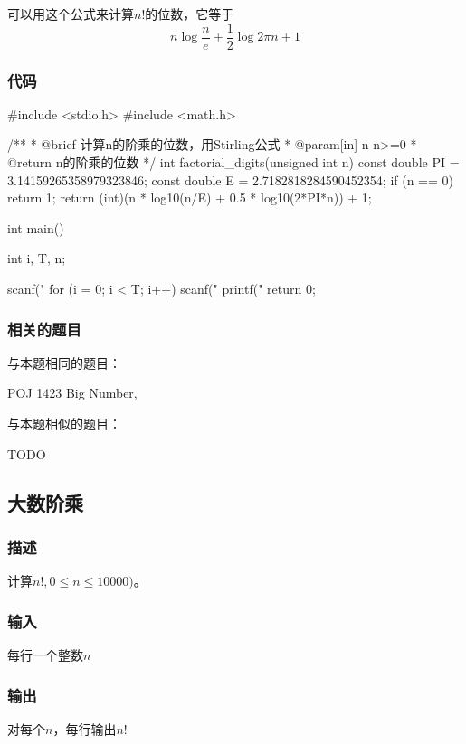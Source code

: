 可以用这个公式来计算$n!$的位数，它等于
$$
n\log{\dfrac{n}{e}}+\dfrac{1}{2}\log{2\pi n}+1
$$

\subsubsection{代码}
\begin{Codex}[label=bigint_factorial_digits.c]
#include <stdio.h>
#include <math.h>

/**
 * @brief 计算n的阶乘的位数，用Stirling公式
 * @param[in] n n>=0
 * @return n的阶乘的位数
 */
int factorial_digits(unsigned int n) {
    const double PI = 3.14159265358979323846;
    const double E = 2.7182818284590452354;
    if (n == 0) return 1;
    return (int)(n * log10(n/E) + 0.5 * log10(2*PI*n)) + 1;
}

int main() {
    int i, T, n;

    scanf("%
    for (i = 0; i < T; i++) {
        scanf("%
        printf("%
    }
    return 0;
}
\end{Codex}

\subsubsection{相关的题目}
与本题相同的题目：
\begindot
\item POJ 1423 Big Number, 
\myenddot

与本题相似的题目：
\begindot
\item  TODO
\myenddot


\subsection{大数阶乘} %
\subsubsection{描述}
计算$n!, 0 \leq n \leq 10000)$。

\subsubsection{输入}
每行一个整数$n$

\subsubsection{输出}
对每个$n$，每行输出$n!$

